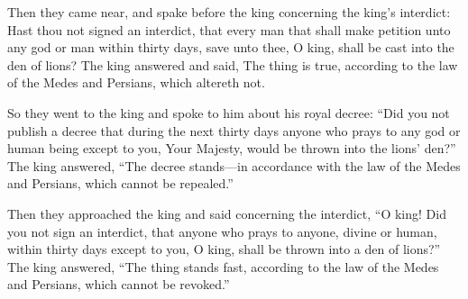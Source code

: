 			\begin{versebox}
					\item[BHS] 
					\item[LXX] 
					\item[ASV] Then they came near, and spake before the king concerning the king's interdict: Hast thou not signed an interdict, that every man that shall make petition unto any god or man within thirty days, save unto thee, O king, shall be cast into the den of lions? The king answered and said, The thing is true, according to the law of the Medes and Persians, which altereth not.
					\item[NIV] So they went to the king and spoke to him about his royal decree: “Did you not publish a decree that during the next thirty days anyone who prays to any god or human being except to you, Your Majesty, would be thrown into the lions’ den?” The king answered, “The decree stands—in accordance with the law of the Medes and Persians, which cannot be repealed.”
					\item[NRSV] Then they approached the king and said concerning the interdict, “O king! Did you not sign an interdict, that anyone who prays to anyone, divine or human, within thirty days except to you, O king, shall be thrown into a den of lions?” The king answered, “The thing stands fast, according to the law of the Medes and Persians, which cannot be revoked.”
			\end{versebox}

